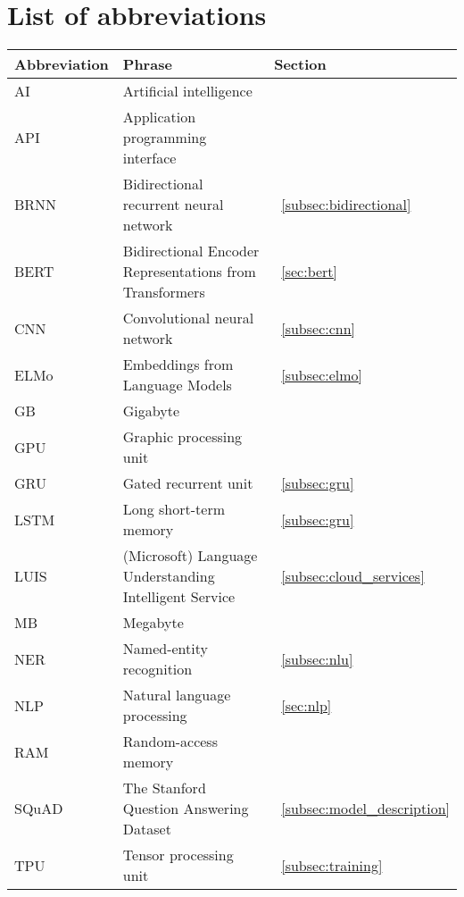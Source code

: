\chapter*{List of abbreviations}
\label{ch:abbrevations}

\begin{tabular}{l l l}
    \textbf{Abbreviation} & \textbf{Phrase} & \textbf{Section} \\
    \hline
    AI & Artificial intelligence \\
    API & Application programming interface\\
    BRNN & Bidirectional recurrent neural network &~\ref{subsec:bidirectional}\\
    BERT & Bidirectional Encoder Representations from Transformers &~\ref{sec:bert}\\
    CNN & Convolutional neural network &~\ref{subsec:cnn}\\
    ELMo & Embeddings from Language Models &~\ref{subsec:elmo}\\
    GB & Gigabyte\\
    GPU & Graphic processing unit \\
    GRU & Gated recurrent unit &~\ref{subsec:gru}\\
    LSTM & Long short-term memory &~\ref{subsec:gru}\\
    LUIS & (Microsoft) Language Understanding Intelligent Service &~\ref{subsec:cloud_services}\\
    MB & Megabyte\\
    NER & Named-entity recognition &~\ref{subsec:nlu}\\
    NLP & Natural language processing &~\ref{sec:nlp}\\
    RAM & Random-access memory \\
    SQuAD & The Stanford Question Answering Dataset &~\ref{subsec:model_description}\\
    TPU & Tensor processing unit &~\ref{subsec:training}\\
\end{tabular}